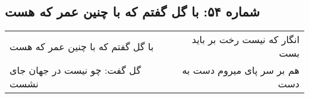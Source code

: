 \begin{center}
\section*{شماره ۵۴: با گل گفتم که با چنین عمر که هست}
\label{sec:054}
\begin{longtable}{l p{0.5cm} r}
با گل گفتم که با چنین عمر که هست
&&
انگار که نیست رخت بر باید بست
\\
گل گفت: چو نیست در جهان جای نشست
&&
هم بر سر پای میروم دست به دست
\\
\end{longtable}
\end{center}
